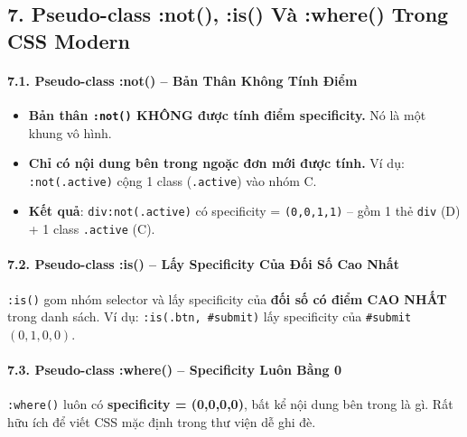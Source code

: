 \documentclass[11pt,oneside]{book}
\newcommand{\codeinline}[1]{\textcolor{accentOrange}{\texttt{#1}}}
\begin{document}
\subsection{7. Pseudo-class :not(), :is() Và :where() Trong CSS Modern}

\paragraph{7.1. Pseudo-class :not() -- Bản Thân Không Tính Điểm}

\begin{conceptBox}
\begin{itemize}[leftmargin=1.5em, itemsep=3pt, parsep=0pt]
    \item \textbf{Bản thân \codeinline{:not()} KHÔNG được tính điểm specificity.} Nó là một khung vô hình.
    \item \textbf{Chỉ có nội dung bên trong ngoặc đơn mới được tính.} Ví dụ: \codeinline{:not(.active)} cộng 1 class (\codeinline{.active}) vào nhóm C.
    \item \textbf{Kết quả}: \codeinline{div:not(.active)} có specificity = \codeinline{(0,0,1,1)} -- gồm 1 thẻ \codeinline{div} (D) + 1 class \codeinline{.active} (C).
\end{itemize}
\end{conceptBox}

\paragraph{7.2. Pseudo-class :is() -- Lấy Specificity Của Đối Số Cao Nhất}

\begin{conceptBox}
\codeinline{:is()} gom nhóm selector và lấy specificity của \textbf{ đối số có điểm CAO NHẤT} trong danh sách. Ví dụ: \codeinline{:is(.btn, \#submit)} lấy specificity của \codeinline{\#submit} $(0,1,0,0)$.
\end{conceptBox}

\paragraph{7.3. Pseudo-class :where() -- Specificity Luôn Bằng 0}

\begin{conceptBox}
\codeinline{:where()} luôn có \textbf{specificity = (0,0,0,0)}, bất kể nội dung bên trong là gì. Rất hữu ích để viết CSS mặc định trong thư viện dễ ghi đè.
\end{conceptBox}
\end{document}
